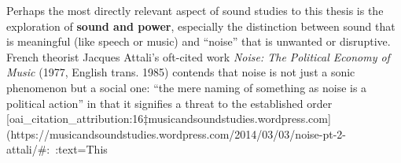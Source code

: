 \documentclass[12pt]{report}
\begin{document}
Perhaps the most directly relevant aspect of sound studies to this thesis is the exploration of \textbf{sound and power}, especially the distinction between sound that is meaningful (like speech or music) and “noise” that is unwanted or disruptive. French theorist Jacques Attali’s oft-cited work \textit{Noise: The Political Economy of Music} (1977, English trans. 1985) contends that noise is not just a sonic phenomenon but a social one: “the mere naming of something as noise is a political action” in that it signifies a threat to the established order [oai_citation_attribution:16‡musicandsoundstudies.wordpress.com](https://musicandsoundstudies.wordpress.com/2014/03/03/noise-pt-2-attali/#:~:text=This%
\end{document}
